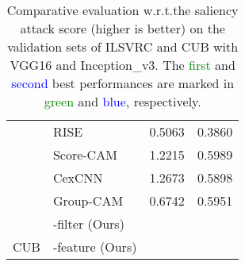 \begin{table}[ht]
{\begin{tabular}{p{2cm}<{\centering}|p{3cm}<{\centering}|p{1.8cm}<{\centering} p{1.8cm}<{\centering}}
                          & RISE \cite{petsiuk2018rise}              
                          & 0.5063        & 0.3860               \\
                          & Score-CAM\cite{wang2019score}               
                          & 1.2215        &  0.5989              \\
                          & CexCNN\cite{debbi2021causal}               
                          &  1.2673       & 0.5898               \\
                          & Group-CAM\cite{zhang2021group}                
                          & 0.6742        & 0.5951               \\
                          & \cellcolor[HTML]{EFEFEF}\name{}-filter (Ours) & \cellcolor[HTML]{EFEFEF}{\textcolor{blue}{1.3691}} & \cellcolor[HTML]{EFEFEF}{\textcolor{blue}{0.8867}} \\
\multirow{-9}{*}{CUB}    & \cellcolor[HTML]{EFEFEF}\name{}-feature (Ours) & \cellcolor[HTML]{EFEFEF}{\textcolor{Green}{2.8111}} & \cellcolor[HTML]{EFEFEF}{\textcolor{Green}{1.0475}}  \\ \bottomrule[0.8pt]
\end{tabular}
}
\caption{
Comparative evaluation w.r.t.\;the saliency attack score (higher is better) on the validation sets of ILSVRC and CUB with VGG16 and Inception\_v3. The \textcolor{Green} {first} and \textcolor{blue} {second} best performances are marked in \textcolor{Green} {green} and \textcolor{blue} {blue}, respectively.
}
\label{tab:Attack}
\end{table}


